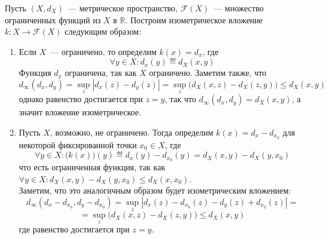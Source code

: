 \documentclass[11pt]{article}
\begin{document}
    \begin{definition}
    Пусть $(X, d_X)$~--- метрическое пространство, $\mathcal{F}(X)$~--- множество ограниченных функций из $X$ в $\mathbb{R}$. Построим изометрическое вложение $k: X \to \mathcal{F}(X)$ следующим образом:
    \begin{enumerate}
        \item Если $X$~--- ограничено, то определим $k(x) = d_x$, где
        \begin{equation*}
            \forall y \in X: d_x(y) \eqdef d_X(x, y)
        \end{equation*}
        Функция $d_x$ ограничена, так как $X$ ограничено. Заметим также, что
        \begin{equation*}
            d_{\infty}(d_x, d_y) = \sup_{z} |d_x(z) - d_y(z)| = \sup_z \big( d_X(x, z) - d_X(z, y) \big) \leq d_X(x, y)
        \end{equation*}
        однако равенство достигается при $z = y$, так что $d_{\infty}(d_x, d_y) = d_X(x, y)$, а значит вложение изометрическое.
        \item Пусть $X$, возможно, не ограничено. Тогда определим $k(x) = d_x - d_{x_0}$ для некоторой фиксированной точки $x_0 \in X$, где
        \begin{equation*}
            \forall y \in X: \big(k(x)\big)(y) \eqdef d_x(y) - d_{x_0}(y) = d_X(x, y) - d_X(y, x_0)
        \end{equation*}
        что есть ограниченная функция, так как $\forall y \in X: d_X(x, y) - d_X(y, x_0) \leq d_X(x, x_0)$. \\
        Заметим, что это аналогичным образом будет изометрическим вложением:
        \begin{equation*}
            d_{\infty}(d_x - d_{x_0}, d_y - d_{x_0}) = \sup_{z} |d_x(z) - d_{x_0}(z) - d_y(z) + d_{x_0}(z)| =
        \end{equation*}
        \begin{equation*}
            = \sup_z \big( d_X(x, z) - d_X(z, y) \big) \leq d_X(x, y)
        \end{equation*}
        где равенство достигается при $z = y$.
    \end{enumerate}
    \end{definition}
\end{document}
